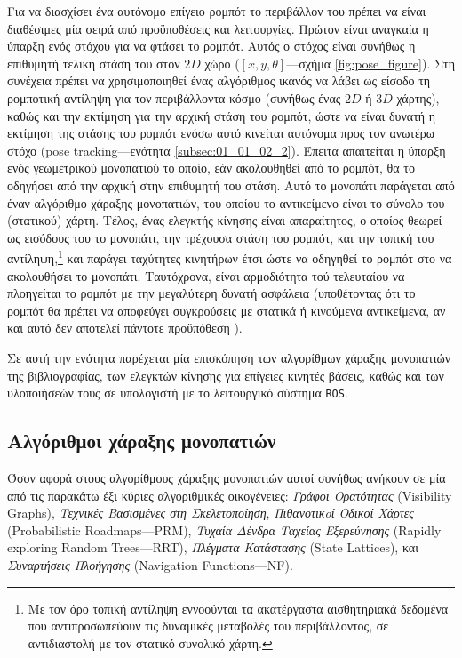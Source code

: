 Για να διασχίσει ένα αυτόνομο επίγειο ρομπότ το περιβάλλον του πρέπει να είναι
διαθέσιμες μία σειρά από προϋποθέσεις και λειτουργίες. Πρώτον είναι αναγκαία η
ύπαρξη ενός στόχου για να φτάσει το ρομπότ. Αυτός ο στόχος είναι συνήθως η
επιθυμητή τελική στάση του στον $2D$ χώρο ($[x, y, \theta]$---σχήμα
\ref{fig:pose_figure}). Στη συνέχεια πρέπει να χρησιμοποιηθεί ένας αλγόριθμος
ικανός να λάβει ως είσοδο τη ρομποτική αντίληψη για τον περιβάλλοντα κόσμο
(συνήθως ένας $2D$ ή $3D$ χάρτης), καθώς και την εκτίμηση για την αρχική στάση
του ρομπότ, ώστε να είναι δυνατή η εκτίμηση της στάσης του ρομπότ ενόσω αυτό
κινείται αυτόνομα προς τον ανωτέρω στόχο (pose tracking---ενότητα
\ref{subsec:01_01_02_2}).  Έπειτα απαιτείται η ύπαρξη ενός γεωμετρικού
μονοπατιού το οποίο, εάν ακολουθηθεί από το ρομπότ, θα το οδηγήσει από την
αρχική στην επιθυμητή του στάση. Αυτό το μονοπάτι παράγεται από έναν αλγόριθμο
χάραξης μονοπατιών, του οποίου το αντικείμενο είναι το σύνολο του (στατικού)
χάρτη. Τέλος, ένας ελεγκτής κίνησης είναι απαραίτητος, ο οποίος θεωρεί ως
εισόδους του το μονοπάτι, την τρέχουσα στάση του ρομπότ, και την τοπική του
αντίληψη,\footnote{Με τον όρο τοπική αντίληψη εννοούνται τα ακατέργαστα
αισθητηριακά δεδομένα που αντιπροσωπεύουν τις δυναμικές μεταβολές του
περιβάλλοντος, σε αντιδιαστολή με τον στατικό συνολικό χάρτη.} και παράγει
ταχύτητες κινητήρων έτσι ώστε να οδηγηθεί το ρομπότ στο να ακολουθήσει το
μονοπάτι. Ταυτόχρονα, είναι αρμοδιότητα τού τελευταίου να πλοηγείται το ρομπότ
με την μεγαλύτερη δυνατή ασφάλεια (υποθέτοντας ότι το ρομπότ θα πρέπει να
αποφεύγει συγκρούσεις με στατικά ή κινούμενα αντικείμενα, αν και αυτό δεν
αποτελεί πάντοτε προϋπόθεση \cite{Gandhi2017}).

Σε αυτή την ενότητα παρέχεται μία επισκόπηση των αλγορίθμων χάραξης μονοπατιών
της βιβλιογραφίας, των ελεγκτών κίνησης για επίγειες κινητές βάσεις, καθώς και
των υλοποιήσεών τους σε υπολογιστή με το λειτουργικό σύστημα \texttt{ROS}.

\subsection{Αλγόριθμοι χάραξης μονοπατιών}
\label{subsection:02_01_02:01}

Όσον αφορά στους αλγορίθμους χάραξης μονοπατιών αυτοί συνήθως ανήκουν σε μία
από τις παρακάτω έξι κύριες αλγοριθμικές οικογένειες: \textit{Γράφοι
Ορατότητας} (Visibility Graphs), \textit{Τεχνικές Βασισμένες στη
Σκελετοποίηση}, \textit{Πιθανοτικoί Οδικοί Χάρτες} (Probabilistic
Roadmaps---PRM), \textit{Τυχαία Δένδρα Ταχείας Εξερεύνησης} (Rapidly exploring
Random Trees---RRT), \textit{Πλέγματα Κατάστασης} (State Lattices), και
\textit{Συναρτήσεις Πλοήγησης} (Navigation Functions---NF).

